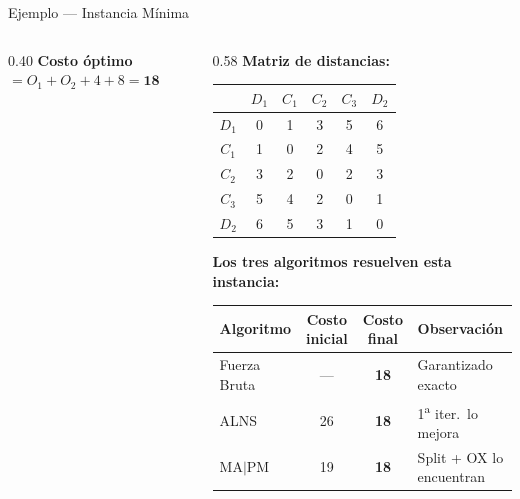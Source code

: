 \documentclass[aspectratio=169,10pt]{beamer}
\begin{document}
\begin{frame}{Ejemplo --- Instancia Mínima}
\begin{columns}[T,onlytextwidth]
\begin{column}{0.40\textwidth}
      \textbf{Costo óptimo} $= O_1+O_2+4+8 = \mathbf{18}$
    \end{column}
    \begin{column}{0.58\textwidth}
      \textbf{Matriz de distancias:}
      \vspace{0.2em}
      \begin{center}\footnotesize
      \begin{tabular}{c|ccccc}
        \toprule
              & $D_1$ & $C_1$ & $C_2$ & $C_3$ & $D_2$ \\
        \midrule
        $D_1$ & 0 & 1 & 3 & 5 & 6 \\
        $C_1$ & 1 & 0 & 2 & 4 & 5 \\
        $C_2$ & 3 & 2 & 0 & 2 & 3 \\
        $C_3$ & 5 & 4 & 2 & 0 & 1 \\
        $D_2$ & 6 & 5 & 3 & 1 & 0 \\
        \bottomrule
      \end{tabular}
      \end{center}
      \vspace{0.4em}
      \textbf{Los tres algoritmos resuelven esta instancia:}
      \vspace{0.2em}
      \begin{center}\footnotesize
      \begin{tabular}{lccl}
        \toprule
        Algoritmo & Costo inicial & Costo final & Observación \\
        \midrule
        Fuerza Bruta & --- & \textbf{18} & Garantizado exacto \\
        ALNS         & 26  & \textbf{18} & 1\textsuperscript{a} iter.\ lo mejora \\
        MA$|$PM      & 19  & \textbf{18} & Split + OX lo encuentran \\
        \bottomrule
      \end{tabular}
      \end{center}
    \end{column}
  \end{columns}
\end{frame}
\end{document}
